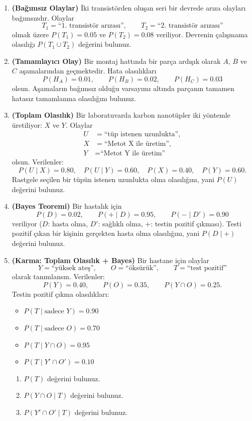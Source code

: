 \documentclass[12pt,a4paper]{article}
\begin{document}
\begin{enumerate}
\item \textbf{(Bağımsız Olaylar)} İki transistörden oluşan seri bir devrede arıza olayları bağımsızdır. Olaylar
\[
T_1=\text{``1. transistör arızası''},\qquad T_2=\text{``2. transistör arızası''}
\]
olmak üzere $P(T_1)=0.05$ ve $P(T_2)=0.08$ veriliyor. Devrenin çalışmama olasılığı $P(T_1\cup T_2)$ değerini bulunuz.

\item \textbf{(Tamamlayıcı Olay)} Bir montaj hattında bir parça ardışık olarak $A$, $B$ ve $C$ aşamalarından geçmektedir. Hata olasılıkları
\[
P(H_A)=0.01,\qquad P(H_B)=0.02,\qquad P(H_C)=0.03
\]
olsun. Aşamaların bağımsız olduğu varsayımı altında parçanın tamamen hatasız tamamlanma olasılığını bulunuz.

\item \textbf{(Toplam Olasılık)} Bir laboratuvarda karbon nanotüpler iki yöntemle üretiliyor: $X$ ve $Y$. Olaylar
\[
\begin{aligned}
U&=\text{``tüp istenen uzunlukta''},\\
X&=\text{``Metot X ile üretim''},\\
Y&=\text{``Metot Y ile üretim''}
\end{aligned}
\]
olsun. Verilenler:
\[
P(U\mid X)=0.80,\quad P(U\mid Y)=0.60,\quad P(X)=0.40,\quad P(Y)=0.60.
\]
Rastgele seçilen bir tüpün istenen uzunlukta olma olasılığını, yani $P(U)$ değerini bulunuz.

\item \textbf{(Bayes Teoremi)} Bir hastalık için
\[
P(D)=0.02,\qquad P(+\mid D)=0.95,\qquad P(-\mid D')=0.90
\]
veriliyor ($D$: hasta olma, $D'$: sağlıklı olma, $+$: testin pozitif çıkması). Testi pozitif çıkan bir kişinin gerçekten hasta olma olasılığını, yani $P(D\mid +)$ değerini bulunuz.

\item \textbf{(Karma: Toplam Olasılık + Bayes)} Bir hastane için olaylar
\[
Y=\text{``yüksek ateş''},\qquad O=\text{``öksürük''},\qquad T=\text{``test pozitif''}
\]
olarak tanımlansın. Verilenler:
\[
P(Y)=0.40,\qquad P(O)=0.35,\qquad P(Y\cap O)=0.25.
\]
Testin pozitif çıkma olasılıkları:
\begin{itemize}
\item $P(T\mid \text{sadece }Y)=0.90$
\item $P(T\mid \text{sadece }O)=0.70$
\item $P(T\mid Y\cap O)=0.95$
\item $P(T\mid Y'\cap O')=0.10$
\end{itemize}
\begin{enumerate}
\item $P(T)$ değerini bulunuz.
\item $P(Y\cap O\mid T)$ değerini bulunuz.
\item $P(Y'\cap O'\mid T)$ değerini bulunuz.
\end{enumerate}
\end{enumerate}
\end{document}
